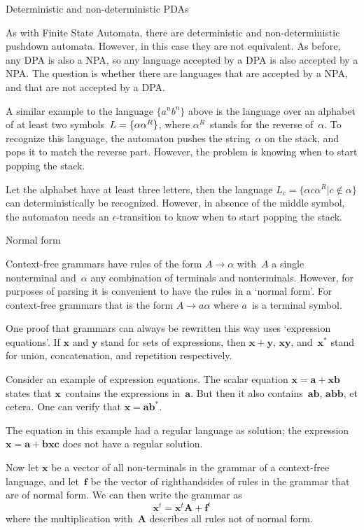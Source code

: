  {Deterministic and non-deterministic PDAs}

As with Finite State Automata, there are deterministic and
non-deterministic pushdown automata. However, in this case they are
not equivalent. As before, any DPA is also a NPA, so any language
accepted by a DPA is also accepted by a NPA. The question is whether
there are languages that are accepted by a NPA, and that are not
accepted by a DPA.

A similar example to the language $\{a^nb^n\}$ above is the language
over an alphabet of at least two
symbols~$L=\nobreak\{\alpha\alpha^R\}$, where $\alpha^R$~stands for
the reverse of~$\alpha$. To recognize this language, the automaton
pushes the string~$\alpha$ on the stack, and pops it to match the
reverse part. However, the problem is knowing when to start popping
the stack.

Let the alphabet have at least three letters, then the language
$L_c=\{\alpha c\alpha^R|c\not\in\alpha\}$ can deterministically be
recognized. However, in absence of the middle symbol, the automaton
needs an $\epsilon$-transition to know when to start popping the stack.

 {Normal form}

Context-free grammars have rules of the form $A\rightarrow\alpha$
with~$A$ a single nonterminal and~$\alpha$ any combination of
terminals and nonterminals. However, for purposes of parsing it is
convenient to have the rules in a `normal
form'. For context-free grammars that is the form $A\rightarrow
a\alpha$ where $a$~is a terminal symbol.

\def\mbx{\mathbf{x}}
\def\mba{\mathbf{a}}
\def\mbb{\mathbf{b}}
\def\mbA{\mathbf{A}}
\def\mby{\mathbf{y}}
\def\mbf{\mathbf{f}}
One proof that grammars can always be rewritten this way uses
`expression equations'. If $\mbx$ and $\mby$ stand for
sets of expressions, then $\mbx+\mby$,
$\mbx\mby$, and~$\mbx^*$ stand for union,
concatenation, and repetition respectively.

Consider an example of expression equations.  The scalar equation
$\mbx=\mba+\mbx\mbb$ states that
$\mbx$~contains the expressions in~$\mba$. But then it
also contains~$\mba\mbb$,
$\mba\mbb\mbb$, et cetera. One can verify that
$\mbx=\mba\mbb^*$.

The equation in this example had a regular language as solution; the
expression $\mbx=\mba+\mbb\mbx\mathbf{c}$ does
not have a regular solution.

Now let $\mbx$ be a vector of all non-terminals in the grammar
of a context-free language, and let~$\mbf$ be the vector of
righthandsides of rules in the grammar that are of normal form. We can
then write the grammar as 
\[ \mbx^t=\mbx^t\mbA+\mbf^t \]
where the multiplication with~$\mbA$ describes all rules not of
normal form. 

